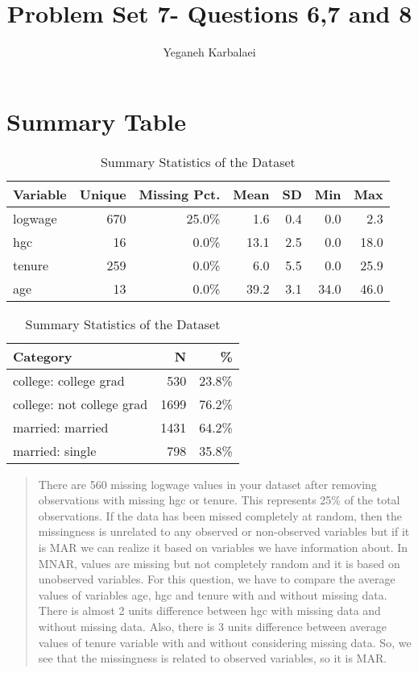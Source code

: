 \documentclass{article}
\title{Problem Set 7- Questions 6,7 and 8}
\author{Yeganeh Karbalaei}
\date{}
\begin{document}
\maketitle

\section{Summary Table}
\begin{table}[htbp]
\centering
\caption{Summary Statistics of the Dataset}
\label{tab:summary-stats}
\begin{tabular}{lrrrrrr}
\hline
Variable & Unique & Missing Pct. & Mean & SD & Min & Max \\
\hline
logwage & 670 & 25.0\% & 1.6 & 0.4 & 0.0 & 2.3 \\
hgc & 16 & 0.0\% & 13.1 & 2.5 & 0.0 & 18.0 \\
tenure & 259 & 0.0\% & 6.0 & 5.5 & 0.0 & 25.9 \\
age & 13 & 0.0\% & 39.2 & 3.1 & 34.0 & 46.0 \\
\hline
\end{tabular}

\vspace{0.5cm}

\begin{tabular}{lrr}
\hline
Category & N & \% \\
\hline
college: college grad & 530 & 23.8\% \\
college: not college grad & 1699 & 76.2\% \\
\hline
married: married & 1431 & 64.2\% \\
married: single & 798 & 35.8\% \\
\hline
\end{tabular}
\end{table}
\begin{quote}
\selectfont %
There are 560 missing logwage values in your dataset after removing observations with missing hgc or tenure. This represents 25\% of the total observations.
If the data has been missed completely at random, then the missingness is unrelated to any observed or non-observed variables but if it is MAR we can realize it based on variables we have information about. In MNAR, values are missing but not completely random and it is based on unobserved variables. For this question, we have to compare the average values of variables age, hgc and tenure with and without missing data. There is almost 2 units difference between hgc with missing data and without missing data. Also, there is 3 units difference between average values of tenure variable with and without considering missing data. So, we see that the missingness is related to observed variables, so it is MAR.  
\end{quote}
\end{document}
